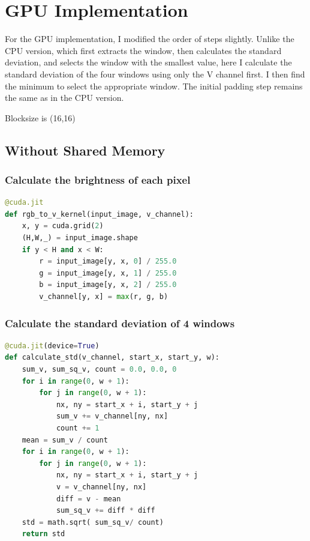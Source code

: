 \documentclass{article}
\begin{document}
\section{GPU Implementation}
For the GPU implementation, I modified the order of steps slightly. 
Unlike the CPU version, which first extracts the window, then calculates the standard deviation, and selects the window with the smallest value, here I calculate the standard deviation of the four windows using only the V channel first. 
I then find the minimum to select the appropriate window. 
The initial padding step remains the same as in the CPU version.

Blocksize is (16,16)

\subsection{Without Shared Memory}
\subsubsection{Calculate the brightness of each pixel}

\begin{lstlisting}[language=Python]
@cuda.jit
def rgb_to_v_kernel(input_image, v_channel):
    x, y = cuda.grid(2)
    (H,W,_) = input_image.shape
    if y < H and x < W:
        r = input_image[y, x, 0] / 255.0
        g = input_image[y, x, 1] / 255.0
        b = input_image[y, x, 2] / 255.0
        v_channel[y, x] = max(r, g, b)
\end{lstlisting}

\subsubsection{Calculate the standard deviation of 4 windows}
\begin{lstlisting}[language=Python]
@cuda.jit(device=True)
def calculate_std(v_channel, start_x, start_y, w):
    sum_v, sum_sq_v, count = 0.0, 0.0, 0
    for i in range(0, w + 1):
        for j in range(0, w + 1):
            nx, ny = start_x + i, start_y + j
            sum_v += v_channel[ny, nx]
            count += 1
    mean = sum_v / count
    for i in range(0, w + 1):
        for j in range(0, w + 1):
            nx, ny = start_x + i, start_y + j
            v = v_channel[ny, nx]
            diff = v - mean
            sum_sq_v += diff * diff
    std = math.sqrt( sum_sq_v/ count)
    return std

\end{lstlisting}
\end{document}
